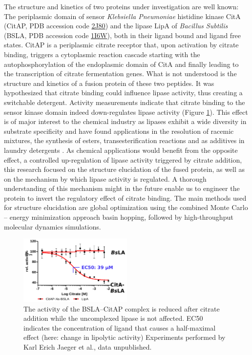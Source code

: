 \documentclass[english, a4paper, 12pt, titlepage, draft]{article}
\newcommand{\PDB}[1]{\href{http://pdb.rcsb.org/pdb/explore/explore.do?structureId=#1}{#1}}
\begin{document}
The structure and kinetics of two proteins under investigation are well known:
The periplasmic domain of sensor \textit{Klebsiella Pneumoniae} histidine kinase CitA (CitAP, PDB accession code \PDB{2J80}) \cite{CitA_2J80}
and the lipase LipA of \textit{Bacillus Subtilis} (BSLA, PDB accession code \PDB{1I6W}), \cite{BSLA_1I6W} both in their ligand bound and ligand free states.
CitAP is a periplasmic citrate receptor that, upon activation by citrate binding, triggers a cytoplasmic reaction cascade starting with the autophosphorylation of the endoplasmic domain of CitA and finally leading to the transcription of citrate fermentation genes.
What is not understood is the structure and kinetics of a fusion protein of these two peptides.
It was hypothesized that citrate binding could influence lipase activity, thus creating a switchable detergent.
Activity measurements indicate that citrate binding to the sensor kinase domain indeed down-regulates lipase activity (Figure \ref{fig:BSLAactivity}).
This effect is of major interest to the chemical industry as lipases exhibit a wide diversity in substrate specificity and have found applications in the resolution of racemic mixtures, the synthesis of esters, transesterification reactions and as additives in laundry detergents \cite{BSdetergents}.
As chemical applications would benefit from the opposite effect, a controlled up-regulation of lipase activity triggered by citrate addition, this research focused on the structure elucidation of the fused protein, as well as on the mechanism by which lipase activity is regulated.
A thorough understanding of this mechanism might in the future enable us to engineer the protein to invert the regulatory effect of citrate binding.
The main methods used for structure elucidation are global optimization using the combined Monte Carlo -- energy minimization approach basin hopping, followed by high-throughput molecular dynamics simulations. 
 

\begin{figure}
    \centering
    \includegraphics[width=0.5\textwidth]{figures/BSLA_activity/BSLA_activity.png}
    \caption{The activity of the BSLA--CitAP complex is reduced after citrate addition while the uncomplexed lipase is not affected.
    EC50 indicates the concentration of ligand that causes a half-maximal effect (here: change in lipolytic activity)
    Experiments performed by Karl Erich Jaeger et al., data unpublished.}   
    \label{fig:BSLAactivity}
\end{figure}
\end{document}
